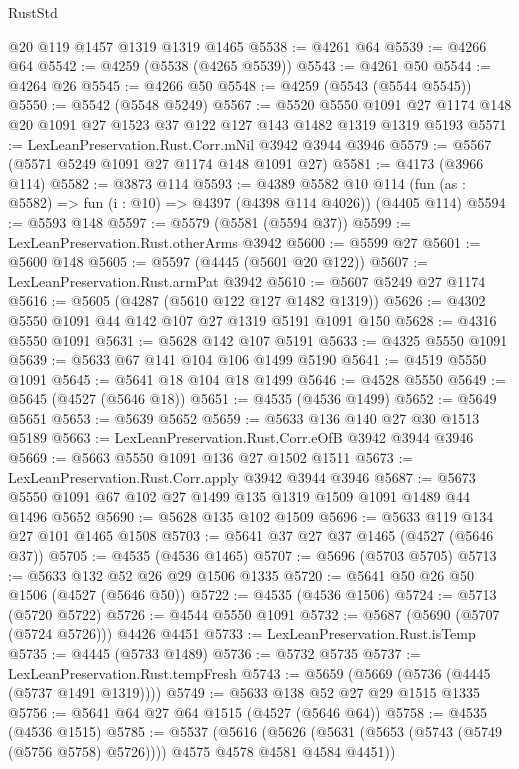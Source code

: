\begin{lexlean}{RustStd}
\begin{coremodule}
    @20
    @119
    @1457
    @1319
    @1319
    @1465
@5538 := @4261 @64
@5539 := @4266 @64
@5542 := @4259 (@5538 (@4265 @5539))
@5543 := @4261 @50
@5544 := @4264 @26
@5545 := @4266 @50
@5548 := @4259 (@5543 (@5544 @5545))
@5550 := @5542 (@5548 @5249)
@5567 := @5520
    @5550
    @1091
    @27
    @1174
    @148
    @20
    @1091
    @27
    @1523
    @37
    @122
    @127
    @143
    @1482
    @1319
    @1319
    @5193
@5571 := LexLeanPreservation.Rust.Corr.mNil @3942 @3944 @3946
@5579 := @5567 (@5571 @5249 @1091 @27 @1174 @148 @1091 @27)
@5581 := @4173 (@3966 @114)
@5582 := @3873 @114
@5593 := @4389
    @5582
    @10
    @114
    (fun (as : @5582) => fun (i : @10) => @4397 (@4398 @114 @4026))
    (@4405 @114)
@5594 := @5593 @148
@5597 := @5579 (@5581 (@5594 @37))
@5599 := LexLeanPreservation.Rust.otherArms @3942
@5600 := @5599 @27
@5601 := @5600 @148
@5605 := @5597 (@4445 (@5601 @20 @122))
@5607 := LexLeanPreservation.Rust.armPat @3942
@5610 := @5607 @5249 @27 @1174
@5616 := @5605 (@4287 (@5610 @122 @127 @1482 @1319))
@5626 := @4302 @5550 @1091 @44 @142 @107 @27 @1319 @5191 @1091 @150
@5628 := @4316 @5550 @1091
@5631 := @5628 @142 @107 @5191
@5633 := @4325 @5550 @1091
@5639 := @5633 @67 @141 @104 @106 @1499 @5190
@5641 := @4519 @5550 @1091
@5645 := @5641 @18 @104 @18 @1499
@5646 := @4528 @5550
@5649 := @5645 (@4527 (@5646 @18))
@5651 := @4535 (@4536 @1499)
@5652 := @5649 @5651
@5653 := @5639 @5652
@5659 := @5633 @136 @140 @27 @30 @1513 @5189
@5663 := LexLeanPreservation.Rust.Corr.eOfB @3942 @3944 @3946
@5669 := @5663 @5550 @1091 @136 @27 @1502 @1511
@5673 := LexLeanPreservation.Rust.Corr.apply @3942 @3944 @3946
@5687 := @5673 @5550 @1091 @67 @102 @27 @1499 @135 @1319 @1509 @1091 @1489 @44 @1496 @5652
@5690 := @5628 @135 @102 @1509
@5696 := @5633 @119 @134 @27 @101 @1465 @1508
@5703 := @5641 @37 @27 @37 @1465 (@4527 (@5646 @37))
@5705 := @4535 (@4536 @1465)
@5707 := @5696 (@5703 @5705)
@5713 := @5633 @132 @52 @26 @29 @1506 @1335
@5720 := @5641 @50 @26 @50 @1506 (@4527 (@5646 @50))
@5722 := @4535 (@4536 @1506)
@5724 := @5713 (@5720 @5722)
@5726 := @4544 @5550 @1091
@5732 := @5687 (@5690 (@5707 (@5724 @5726))) @4426 @4451
@5733 := LexLeanPreservation.Rust.isTemp
@5735 := @4445 (@5733 @1489)
@5736 := @5732 @5735
@5737 := LexLeanPreservation.Rust.tempFresh
@5743 := @5659 (@5669 (@5736 (@4445 (@5737 @1491 @1319))))
@5749 := @5633 @138 @52 @27 @29 @1515 @1335
@5756 := @5641 @64 @27 @64 @1515 (@4527 (@5646 @64))
@5758 := @4535 (@4536 @1515)
@5785 := @5537
    (@5616
      (@5626 (@5631 (@5653 (@5743 (@5749 (@5756 @5758) @5726)))) @4575 @4578 @4581 @4584 @4451))

\end{coremodule}
\end{lexlean}
